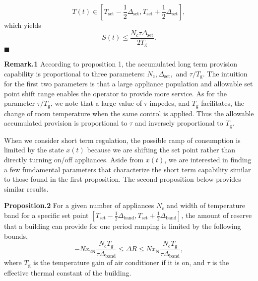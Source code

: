 \documentclass[journal]{IEEEtran}
\begin{document}
\begin{equation}
T(t)\in[T_{\textrm{set}}-\frac{1}{2}\Delta_{\textrm{set}},T_{\textrm{set}}+\frac{1}{2}\Delta_{\textrm{set}}],
\end{equation}
which yields
\begin{equation}
S(t)\leq \frac{N_{c}\tau\Delta_{\textrm{set}}}{2T_{\textrm{g}}}.
\end{equation}
$\blacksquare$

\textbf{Remark.1} According to proposition 1, the accumulated long term provision capability is proportional to three parameters: $N_{\textrm{c}}, \Delta_{\textrm{set}},$ and $\tau/T_{\textrm{g}}$. The intuition for the first two parameters is that a large appliance population and allowable set point shift range enables the operator to provide more service. As for the parameter $\tau/T_{\textrm{g}}$, we note that a large value of $\tau$ impedes, and $T_{\textrm{g}}$ facilitates, the change of room temperature when the same control is applied. Thus the allowable accumulated provision is proportional to $\tau$ and inversely proportional to $T_{\textrm{g}}$.

When we consider short term regulation, the possible ramp of consumption is limited by the state $x(t)$ because we are shifting the set point rather than directly turning on/off appliances. Aside from $x(t)$, we are interested in finding a few fundamental parameters that characterize the short term capability similar to those found in the first proposition. The second proposition below provides similar results.

\textbf{Proposition.2} For a given number of appliances $N_{\textrm{c}}$ and width of temperature band for a specific set point $[T_{\textrm{set}}-\frac{1}{2}\Delta_{\textrm{band}},T_{\textrm{set}}+\frac{1}{2}\Delta_{\textrm{band}}]$, the amount of reserve that a building can provide for one period ramping is limited by the following bounds,
\begin{equation}
\label{them2}
-Nx_{\textrm{2N}}\frac{N_{\textrm{c}}T_{\textrm{g}}}{\tau\Delta_{\textrm{band}}}\leq \Delta R\leq Nx_{\textrm{N}}\frac{N_{\textrm{c}}T_{\textrm{g}}}{\tau\Delta_{\textrm{band}}},
\end{equation}
where $T_{\textrm{g}}$ is the temperature gain of air conditioner if it is on, and $\tau$ is the effective thermal constant of the building.
\end{document}
